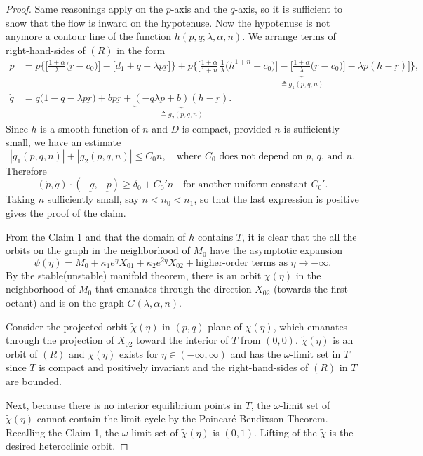 \documentclass[a4paper,11pt]{article}
\def\blue{\color{blue}}
\def\dpp{\dot{p}}
\def\dqq{\dot{q}}
\begin{document}
\begin{proof}
Same reasonings apply on the $p$-axis and the $q$-axis, so it is sufficient to show that the flow is inward on the hypotenuse. Now the hypotenuse is not anymore a contour line of the function $h(p,q;\lambda,\alpha,n)$. We arrange terms of right-hand-sides of $(R)$ in the form
\begin{align*}
 {\dpp}&=p\bigg\{\Big[\frac{1+\alpha}{\lambda }\Big(\underbar{r}-c_0\Big)\Big] -\Big[d_1 + q + \lambda p\underbar{r}\Big]\bigg\} + \underbrace{p\bigg\{\Big[\frac{1+\alpha}{1+n}\,\frac{1}{\lambda }\Big(h^{1+n}-c_0\Big)\Big]-\Big[\frac{1+\alpha}{\lambda }\Big(\underbar{r}-c_0\Big)\Big] -\lambda p(h-\underbar{r})\Big]\bigg\}}_\text{$\triangleq g_1(p,q,n)$},\\
 {\dqq}&=q\Big(1-q-\lambda p \underbar{r}\Big) + bp\underbar{r} + \underbrace{(-q\lambda p+b) (h-\underbar{r})}_\text{$\triangleq g_2(p,q,n)$}.
\end{align*}
Since $h$ is a smooth function of $n$ and $D$ is compact, provided $n$ is sufficiently small, we have an estimate
\begin{equation}
 |g_1(p,q,n)| + |g_2(p,q,n)| \le C_0 n, \quad \text{where $C_0$ does not depend on $p$, $q$, and $n$.}
\end{equation}
Therefore
$$ (\dot{p},\dot{q}) \cdot(-\underbar{q},-\underbar{p}) \ge \delta_0 + C_0'n \quad \text{for another uniform constant $C_0'$}.$$
Taking $n$ sufficiently small, say $n<n_0<n_1$, so that the last expression is positive gives the proof of the claim. 

\medskip
{\blue
From the Claim 1 and that the domain of $h$ contains $T$, it is clear that the all the orbits on the graph in the neighborhood of $M_0$ have the asymptotic expansion
$$\psi(\eta) = M_0 + \kappa_1 e^\eta X_{01} + \kappa_2 e^{2\eta}X_{02} + \text{higher-order terms as $\eta \rightarrow -\infty$.}$$ By the stable(unstable) manifold theorem, there is an orbit $\chi(\eta)$ in the neighborhood of $M_0$ that emanates through the direction $X_{02}$ (towards the first octant) and is on the graph $G(\lambda,\alpha,n)$. 

Consider the projected orbit $\tilde{\chi}(\eta)$ in $(p,q)$-plane of $\chi(\eta)$, which emanates through the projection of $X_{02}$ toward the interior of $T$ from $(0,0)$. $\tilde{\chi}(\eta)$ is an orbit of $(R)$ and $\tilde{\chi}(\eta)$ exists for $\eta \in (-\infty, \infty)$ and has the $\omega$-limit set in $T$ since $T$ is compact and positively invariant and the right-hand-sides of $(R)$ in $T$ are bounded.

Next, because there is no interior equilibrium points in $T$, the $\omega$-limit set of $\tilde{\chi}(\eta)$ cannot contain the limit cycle by the Poincar\'e-Bendixson Theorem. Recalling the Claim 1, the $\omega$-limit set of $\tilde{\chi}(\eta)$ is $(0,1)$. Lifting of the $\tilde{\chi}$ is the desired heteroclinic orbit.
}
\end{proof}
\end{document}
